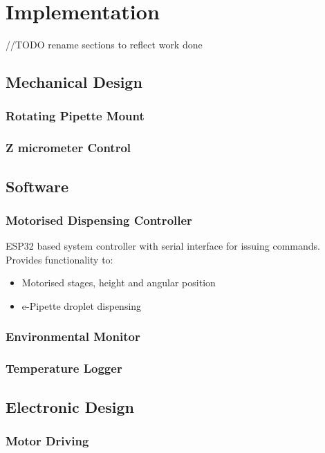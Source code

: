 \chapter{Implementation}\label{C:imple}


//TODO rename sections to reflect work done
\section{Mechanical Design}

\subsection{Rotating Pipette Mount}

\subsection{Z micrometer Control}

\section{Software}

\subsection{Motorised Dispensing Controller}
ESP32 based system controller with serial interface for issuing commands. Provides functionality to:
\begin{itemize}
    \item Motorised stages, height and angular position
    \item e-Pipette droplet dispensing 
\end{itemize}

\subsection{Environmental Monitor}
\subsection{Temperature Logger}

\section{Electronic Design}

\subsection{Motor Driving}

